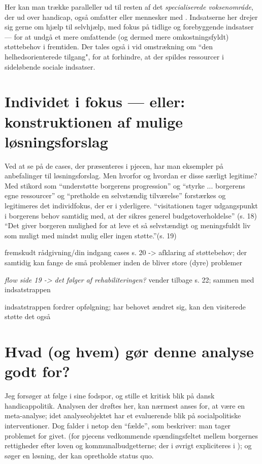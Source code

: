 Her kan man trække paralleller ud til resten af det \textit{specialiserede voksenomráde}, der ud over handicap, også omfatter  eller mennesker med  \autocite[s. 2]{kommunerneslandsforeningFaktaOmKommnernes2019}.
Indsatserne her drejer sig gerne om hjælp til selvhjælp, med fokus på tidlige og forebyggende indsatser — for at undgå et mere omfattende (og dermed mere omkostningsfyldt) støttebehov i fremtiden. Der tales også i vid omstrækning om “den helhedsorienterede tilgang", for at forhindre, at der spildes ressourcer i sideløbende sociale indsatser. \autocite[s. 18]{klStyringAfDet2017}

\section{Individet i fokus — eller: konstruktionen af mulige løsningsforslag}
Ved at se på de cases, der præsenteres i pjecen, har man eksempler på anbefalinger til løsningsforslag.
Men hvorfor og hvordan er disse særligt legitime?
Med stikord som “understøtte borgerens progression” og “styrke ... borgerens egne ressourcer” og “pretholde en selvstændig tilværelse” \autocite[s. 19]{klStyringAfDet2017} forstærkes og legitimeres det individfokus, der er i  yderligere.
“visitationen tager udgangspunkt i borgerens behov samtidig med, at der sikres generel budgetoverholdelse” (s. 18)
“Det giver borgeren mulighed for at leve et så selvstændigt og meningsfuldt liv som muligt med mindst mulig eller ingen støtte.”(s. 19)




fremskudt rådgivning/din indgang cases s. 20 -> afklaring af støttebehov; der samtidig kan fange de små problemer inden de bliver store (dyre) problemer

\textit{flow side 19 -> det følger af rehabiliteringen?} vender tilbage s. 22; sammen med indsatstrappen

indsatstrappen fordrer opfølgning; har behovet ændret sig, kan den visiterede støtte det også



\section{Hvad (og hvem) gør denne analyse godt for?}
Jeg forsøger at følge i  sine fodspor, og stille et kritisk blik på dansk handicappolitik.
Analysen der drøftes her, kan nærmest anses for, at være en meta-analyse; idet analyseobjektet har et evaluerende blik på socialpolitiske interventioner.
Dog falder  i netop den “fælde”, som \citeauthor{scheurichPolicyArchaeologyNew1994} beskriver: man tager problemet for givet. (for pjecens vedkommende spændingsfeltet mellem borgernes rettigheder efter loven og kommunalbudgetterne; der i øvrigt expliciteres i ); og søger en løsning, der kan opretholde status quo.
